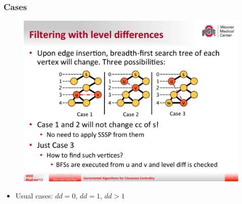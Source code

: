 \begin{frame}
  \frametitle{Cases}

  \begin{figure}[H]
    \centering
    \includegraphics[width=\textwidth]{imgs/sksc-cases}
  \end{figure}
  
  \begin{itemize}
    \item Usual cases: $dd=0$, $dd=1$, $dd>1$
  \end{itemize}
\end{frame}


